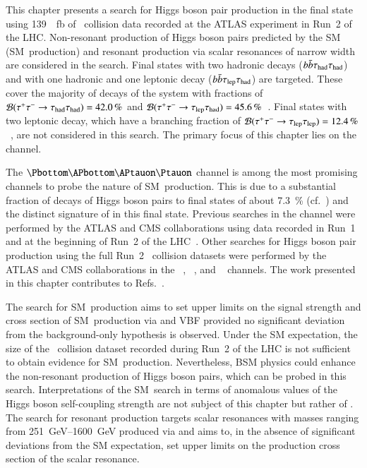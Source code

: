 This chapter presents a search for Higgs boson pair production in the \bbtautau
final state using \SI{139}{\per\femto\barn} of \pp~collision data recorded at
the ATLAS experiment in Run~2 of the LHC. Non-resonant production of Higgs boson
pairs predicted by the SM (SM~\HH production) and resonant production via scalar
resonances of narrow width are considered in the search. Final states with two
hadronic \taulepton decays ($b\bar{b}\tau_{\text{had}}\tau_{\text{had}}$) and with one hadronic and one
leptonic \taulepton decay ($b\bar{b}\tau_{\text{lep}}\tau_{\text{had}}$) are targeted. These cover the
majority of decays of the \tautau system with fractions of
$\mathcal{B}(\tau^{+} \tau^{-} \to \tau_{\text{had}}\tau_{\text{had}}) = \SI{42.0}{\percent}$ and
$\mathcal{B}(\tau^{+} \tau^{-} \to \tau_{\text{lep}}\tau_{\text{had}}) =
\SI{45.6}{\percent}$~\cite{Zyla:2020zbs}. Final states with two leptonic
\taulepton decay, which have a branching fraction of
$\mathcal{B}(\tau^{+} \tau^{-} \to \tau_{\text{lep}}\tau_{\text{lep}}) =
\SI{12.4}{\percent}$~\cite{Zyla:2020zbs}, are not considered in this search.
The primary focus of this chapter lies on the \hadhad channel.

The $\bbtautau$ channel is among the most promising channels to probe the nature
of SM~\HH production. This is due to a substantial fraction of decays of Higgs
boson pairs to \bbtautau final states of about \SI{7.3}{\percent}
(cf.~) and the distinct signature of \tauleptons
in this final state. Previous searches in the \bbtautau channel were performed
by the ATLAS and CMS collaborations using data recorded in
Run~1~\cite{HIGG-2013-33,CMS-HIG-15-013} and at the beginning of Run~2 of the
LHC~\cite{HIGG-2016-16-witherratum,CMS-HIG-17-002}.  Other searches for Higgs
boson pair production using the full Run~2 \pp~collision datasets were performed
by the ATLAS and CMS collaborations in the \bbtautau~\cite{CMS-HIG-20-010},
\bbbb~\cite{HDBS-2019-29,CMS-HIG-20-005}, and
\bbyy~\cite{HDBS-2018-34,CMS-HIG-19-018} channels.
The work presented in this chapter contributes to
Refs.~\cite{ATLAS-CONF-2021-030,HDBS-2018-40}.

The search for SM~\HH production aims to set upper limits on the signal strength
and cross section of SM~\HH production via \ggF and VBF provided no significant
deviation from the background-only hypothesis is observed. Under the SM
expectation, the size of the \pp~collision dataset recorded during Run~2 of the
LHC is not sufficient to obtain evidence for SM~\HH production.  Nevertheless,
BSM physics could enhance the non-resonant production of Higgs boson pairs,
which can be probed in this search.
Interpretations of the SM~\HH search in terms of anomalous values of the Higgs
boson self-coupling strength are not subject of this chapter but rather of
. The search for resonant \HH production targets
scalar resonances with masses ranging from \SIrange{251}{1600}{\GeV} produced
via \ggF and aims to, in the absence of significant deviations from the SM
expectation, set upper limits on the production cross section of the scalar
resonance.

